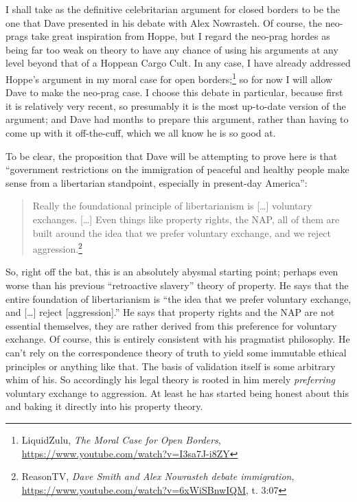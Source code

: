 \documentclass[11pt]{article}
\begin{document}
I shall take as the definitive celebritarian argument for closed borders to be the one that Dave presented in his debate with Alex Nowrasteh. Of course, the neo-prags take great inspiration from Hoppe, but I regard the neo-prag hordes as being far too weak on theory to have any chance of using his arguments at any level beyond that of a Hoppean Cargo Cult. In any case, I have already addressed Hoppe's argument in my moral case for open borders;\footnote{LiquidZulu, \emph{The Moral Case for Open Borders}, \url{https://www.youtube.com/watch?v=I3sa7J-i8ZY}} so for now I will allow Dave to make the neo-prag case. I choose this debate in particular, because first it is relatively very recent, so presumably it is the most up-to-date version of the argument; and Dave had months to prepare this argument, rather than having to come up with it off-the-cuff, which we all know he is so good at.

To be clear, the proposition that Dave will be attempting to prove here is that ``government restrictions on the immigration of peaceful and healthy people make sense from a libertarian standpoint, especially in present-day America'':
\begin{quote}
Really the foundational principle of libertarianism is [\ldots{}] voluntary exchanges. [\ldots{}] Even things like property rights, the NAP, all of them are built around the idea that we prefer voluntary exchange, and we reject aggression.\footnote{ReasonTV, \emph{Dave Smith and Alex Nowrasteh debate immigration}, \url{https://www.youtube.com/watch?v=6xWiSBnwIQM}, t. 3:07}
\end{quote}

So, right off the bat, this is an absolutely abysmal starting point; perhaps even worse than his previous ``retroactive slavery'' theory of property. He says that the entire foundation of libertarianism is ``the idea that we prefer voluntary exchange, and [\ldots{}] reject [aggression].'' He says that property rights and the NAP are not essential themselves, they are rather derived from this preference for voluntary exchange. Of course, this is entirely consistent with his pragmatist philosophy. He can't rely on the correspondence theory of truth to yield some immutable ethical principles or anything like that. The basis of validation itself is some arbitrary whim of his. So accordingly his legal theory is rooted in him merely \emph{preferring} voluntary exchange to aggression. At least he has started being honest about this and baking it directly into his property theory.
\end{document}
